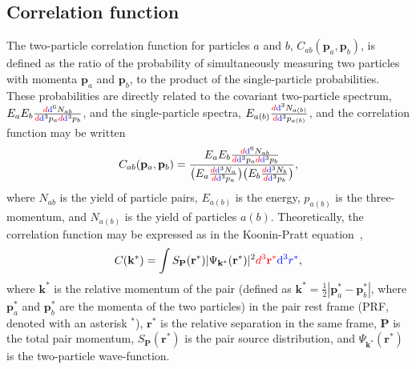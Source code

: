 \documentclass[ALICE,manyauthors]{cernphprep}
\begin{document}
\subsection{Correlation function}
\label{sec:CorrelationFunction}
The {\color{red}two-particle} correlation function for particles $a$ and $b$, $C_{ab}(\mathbf{p}_{a},\mathbf{p}_{b})$, is defined as the ratio of the probability of simultaneously measuring two particles with momenta $\mathbf{p}_{a}$ and $\mathbf{p}_{b}$, to the product of the single-particle probabilities.
These probabilities are directly related to the covariant two-particle spectrum, $E_{a}E_{b}\frac{{\color{red}d}{\color{blue}\mathrm{d}}^{6}N_{ab}}{{\color{red}d}{\color{blue}\mathrm{d}}^{3}p_{a}{\color{red}d}{\color{blue}\mathrm{d}}^{3}p_{b}}$, and the single-particle spectra, $E_{a(b)}\frac{{\color{red}d}{\color{blue}\mathrm{d}}^{3}N_{a(b)}}{{\color{red}d}{\color{blue}\mathrm{d}}^{3}p_{a(b)}}$, and the correlation function may be written
\begin{equation}
  C_{ab}(\mathbf{p}_{a},\mathbf{p}_{b}) = \frac{E_{a}E_{b}\frac{{\color{red}d}{\color{blue}\mathrm{d}}^{6}N_{ab}}{{\color{red}d}{\color{blue}\mathrm{d}}^{3}p_{a}{\color{red}d}{\color{blue}\mathrm{d}}^{3}p_{b}}}{\big( E_{a}\frac{{\color{red}d}{\color{blue}\mathrm{d}}^{3}N_{a}}{{\color{red}d}{\color{blue}\mathrm{d}}^{3}p_{a}} \big) \big( E_{b}\frac{{\color{red}d}{\color{blue}\mathrm{d}}^{3}N_{b}}{{\color{red}d}{\color{blue}\mathrm{d}}^{3}p_{b}} \big)},
\label{eqn:CfRatioSpectra}
\end{equation}
where $N_{ab}$ is the yield of particle pairs, $E_{a(b)}$ is the energy, $p_{a(b)}$ is the three-momentum, and $N_{a(b)}$ is the yield of particles $a(b)$.
Theoretically, the correlation function may be expressed as in the Koonin-Pratt equation~\cite{Koonin:1977fh, Pratt:1990zq},
\begin{equation}
 C(\mathbf{k^{*}}) = \int S_{\mathbf{P}}(\mathbf{r^{*}})|\Psi_{\mathbf{k^{*}}}(\mathbf{r^{*}})|^{2}{\color{red}d^{3}\mathbf{r^{*}}}{\color{blue}\mathrm{d}^{3}r^{*}},
\label{eqn:KooninPrattEqn}
\end{equation}
where $\mathbf{k}^{*}$ is the relative momentum of the pair (defined as $\mathbf{k}^{*} = \frac{1}{2}|\mathbf{p}_{a}^{*}-\mathbf{p}_{b}^{*}|$, where $\mathbf{p}_{a}^{*}$ and $\mathbf{p}_{b}^{*}$ are the momenta of the two particles) in the pair rest frame (PRF, denoted with an asterisk $^{*}$), $\mathbf{r}^{*}$ is the relative separation in the same frame, $\mathbf{P}$ is the total pair momentum, $S_{\mathbf{P}}(\mathbf{r^{*}})$ is the pair source distribution, and $\Psi_{\mathbf{k^{*}}}(\mathbf{r^{*}})$ is the two-particle wave-function.
\end{document}
